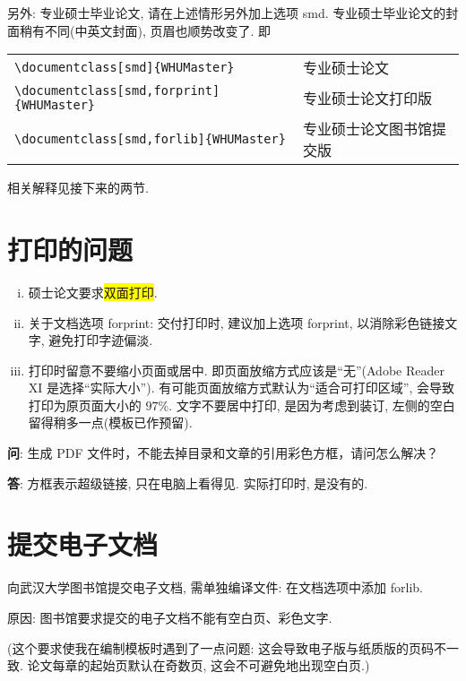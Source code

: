 \documentclass{WHUMaster}   %
\begin{document}
另外: 专业硕士毕业论文, 请在上述情形另外加上选项 smd. 专业硕士毕业论文的封面稍有不同(中英文封面), 页眉也顺势改变了. 即
\begin{table}[ht]\centering
\begin{tabular}{ll}
\hline
   \verb|\documentclass[smd]{WHUMaster}|               &  专业硕士论文 \\
   \verb|\documentclass[smd,forprint]{WHUMaster}|    &  专业硕士论文打印版  \\
   \verb|\documentclass[smd,forlib]{WHUMaster}|       &  专业硕士论文图书馆提交版  \\
\hline
\end{tabular}
\end{table}



相关解释见接下来的两节.



\section{打印的问题}
\begin{enumerate}[i)]
  \item  硕士论文要求\colorbox{yellow}{双面打印}.
  \item  关于文档选项 forprint: 交付打印时, 建议加上选项 forprint, 以消除彩色链接文字, 避免打印字迹偏淡.
  \item  打印时留意不要缩小页面或居中. 即页面放缩方式应该是``无''(Adobe Reader XI 是选择``实际大小'').
           有可能页面放缩方式默认为``适合可打印区域'', 会导致打印为原页面大小的 $97\%$.
           文字不要居中打印, 是因为考虑到装订, 左侧的空白留得稍多一点(模板已作预留).
\end{enumerate}

\textbf{问}: {\kaishu 生成 PDF 文件时，不能去掉目录和文章的引用彩色方框，请问怎么解决？}

\textbf{答}: {\kaishu 方框表示超级链接, 只在电脑上看得见. 实际打印时, 是没有的.}





\section{提交电子文档}

向武汉大学图书馆提交电子文档, 需单独编译文件: 在文档选项中添加 forlib.

原因: 图书馆要求提交的电子文档不能有空白页、彩色文字.

({\kaishu 这个要求使我在编制模板时遇到了一点问题: 这会导致电子版与纸质版的页码不一致.  论文每章的起始页默认在奇数页, 这会不可避免地出现空白页.})
\end{document}
